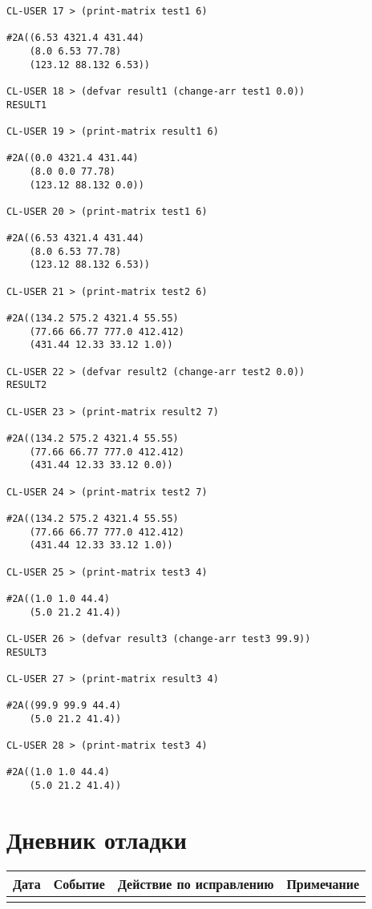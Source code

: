 \documentclass[12pt]{article}
\begin{document}
\begin{lstlisting}
CL-USER 17 > (print-matrix test1 6)

#2A((6.53 4321.4 431.44)
    (8.0 6.53 77.78)
    (123.12 88.132 6.53))

CL-USER 18 > (defvar result1 (change-arr test1 0.0))
RESULT1

CL-USER 19 > (print-matrix result1 6)

#2A((0.0 4321.4 431.44)
    (8.0 0.0 77.78)
    (123.12 88.132 0.0))

CL-USER 20 > (print-matrix test1 6)

#2A((6.53 4321.4 431.44)
    (8.0 6.53 77.78)
    (123.12 88.132 6.53))

CL-USER 21 > (print-matrix test2 6)

#2A((134.2 575.2 4321.4 55.55)
    (77.66 66.77 777.0 412.412)
    (431.44 12.33 33.12 1.0))

CL-USER 22 > (defvar result2 (change-arr test2 0.0))
RESULT2

CL-USER 23 > (print-matrix result2 7)

#2A((134.2 575.2 4321.4 55.55)
    (77.66 66.77 777.0 412.412)
    (431.44 12.33 33.12 0.0))

CL-USER 24 > (print-matrix test2 7)

#2A((134.2 575.2 4321.4 55.55)
    (77.66 66.77 777.0 412.412)
    (431.44 12.33 33.12 1.0))

CL-USER 25 > (print-matrix test3 4)

#2A((1.0 1.0 44.4)
    (5.0 21.2 41.4))

CL-USER 26 > (defvar result3 (change-arr test3 99.9))
RESULT3

CL-USER 27 > (print-matrix result3 4)

#2A((99.9 99.9 44.4)
    (5.0 21.2 41.4))

CL-USER 28 > (print-matrix test3 4)

#2A((1.0 1.0 44.4)
    (5.0 21.2 41.4))
\end{lstlisting}

\section{Дневник отладки}
\begin{tabular}{|m{2cm}|m{6cm}|m{4cm}|m{3cm}|}
\hline
Дата & Событие & Действие по исправлению & Примечание \\
\hline
& & & \\
\hline
\end{tabular}
\end{document}
